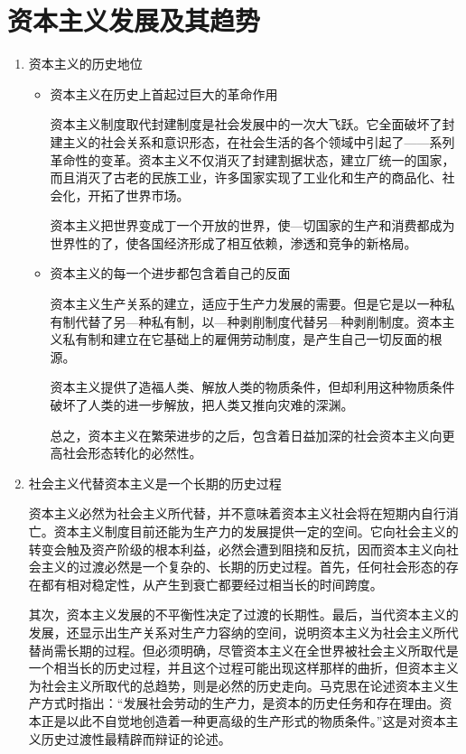 \documentclass[device=pad,lang=cn,UTF8]{elegantbook}
\begin{document}
    \chapter{资本主义发展及其趋势}
    \begin{enumerate}
        \item 资本主义的历史地位
        \begin{itemize}
            \item 资本主义在历史上首起过巨大的革命作用\par
            资本主义制度取代封建制度是社会发展中的一次大飞跃。它全面破坏了封建主义的社会关系和意识形态，在社会生活的各个领域中引起了——系列革命性的变革。资本主义不仅消灭了封建割据状态，建立厂统一的国家，而且消灭了古老的民族工业，许多国家实现了工业化和生产的商品化、社会化，开拓了世界市场。\par
            资本主义把世界变成丁一个开放的世界，使—切国家的生产和消费都成为世界性的了，使各国经济形成了相互依赖，渗透和竞争的新格局。
            \item 资本主义的每一个进步都包含着自己的反面\par
            资本主义生产关系的建立，适应于生产力发展的需要。但是它是以一种私有制代替了另—种私有制，以—种剥削制度代替另—种剥削制度。资本主义私有制和建立在它基础上的雇佣劳动制度，是产生自己一切反面的根源。\par
            资本主义提供了造福人类、解放人类的物质条件，但却利用这种物质条件破坏了人类的进一步解放，把人类又推向灾难的深渊。\par
            总之，资本主义在繁荣进步的之后，包含着日益加深的社会资本主义向更高社会形态转化的必然性。
        \end{itemize}
        \item 社会主义代替资本主义是一个长期的历史过程\par
        资本主义必然为社会主义所代替，并不意味着资本主义社会将在短期内自行消亡。资本主义制度目前还能为生产力的发展提供一定的空间。它向社会主义的转变会触及资产阶级的根本利益，必然会遭到阻挠和反抗，因而资本主义向社会主义的过渡必然是一个复杂的、长期的历史过程。首先，任何社会形态的存在都有相对稳定性，从产生到衰亡都要经过相当长的时间跨度。\par
        其次，资本主义发展的不平衡性决定了过渡的长期性。最后，当代资本主义的发展，还显示出生产关系对生产力容纳的空间，说明资本主义为社会主义所代替尚需长期的过程。但必须明确，尽管资本主义在全世界被社会主义所取代是一个相当长的历史过程，并且这个过程可能出现这样那样的曲折，但资本主义为社会主义所取代的总趋势，则是必然的历史走向。马克思在论述资本主义生产方式时指出：“发展社会劳动的生产力，是资本的历史任务和存在理由。资本正是以此不自觉地创造着一种更高级的生产形式的物质条件。”这是对资本主义历史过渡性最精辟而辩证的论述。
    \end{enumerate}
\end{document}
